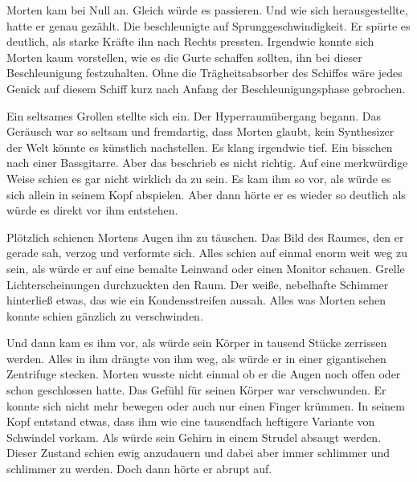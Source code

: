 \par

Morten kam bei Null an. Gleich würde es passieren. Und wie sich herausgestellte, hatte er genau gezählt. Die  beschleunigte auf Sprunggeschwindigkeit. Er spürte es deutlich, als starke Kräfte ihn nach Rechts pressten. Irgendwie konnte sich Morten kaum vorstellen, wie es die Gurte schaffen sollten, ihn bei dieser Beschleunigung festzuhalten. Ohne die Trägheitsabsorber des Schiffes wäre jedes Genick auf diesem Schiff kurz nach Anfang der Beschleunigungsphase gebrochen.

\par

Ein seltsames Grollen stellte sich ein. Der Hyperraumübergang begann. Das Geräusch war so seltsam und fremdartig, dass Morten glaubt, kein Synthesizer der Welt könnte es künstlich nachstellen. Es klang irgendwie tief. Ein bisschen nach einer Bassgitarre. Aber das beschrieb es nicht richtig. Auf eine merkwürdige Weise schien es gar nicht wirklich da zu sein. Es kam ihm so vor, als würde es sich allein in seinem Kopf abspielen. Aber dann hörte er es wieder so deutlich als würde es direkt vor ihm entstehen.

\par

Plötzlich schienen Mortens Augen ihn zu täuschen. Das Bild des Raumes, den er gerade sah, verzog und verformte sich. Alles schien auf einmal enorm weit weg zu sein, als würde er auf eine bemalte Leinwand oder einen Monitor schauen. Grelle Lichterscheinungen durchzuckten den Raum. Der weiße, nebelhafte Schimmer hinterließ etwas, das wie ein Kondensstreifen aussah. Alles was Morten sehen konnte schien gänzlich zu verschwinden.

\par

Und dann kam es ihm vor, als würde sein Körper in tausend Stücke zerrissen werden. Alles in ihm drängte von ihm weg, als würde er in einer gigantischen Zentrifuge stecken. Morten wusste nicht einmal ob er die Augen noch offen oder schon geschlossen hatte. Das Gefühl für seinen Körper war verschwunden. Er konnte sich nicht mehr bewegen oder auch nur einen Finger krümmen. In seinem Kopf entstand etwas, dass ihm wie eine tausendfach heftigere Variante von Schwindel vorkam. Als würde sein Gehirn in einem Strudel absaugt werden. Dieser Zustand schien ewig anzudauern und dabei aber immer schlimmer und schlimmer zu werden. Doch dann hörte er abrupt auf.

\par


